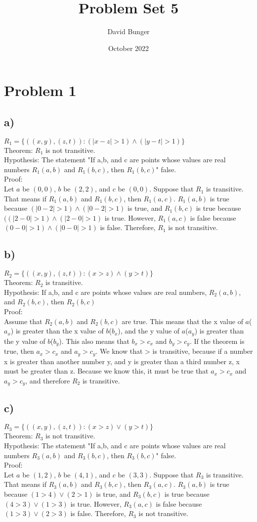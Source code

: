 \documentclass{article}
\title{Problem Set 5}
\author{David Bunger}
\date{October 2022}
\begin{document}
\maketitle

\section*{Problem 1}
\subsection*{a)}
$R_1 = \{((x,y),(z,t)): (|x-z|>1)\land (|y-t|>1)\}$\\
Theorem: $R_1$ is not transitive.\\
Hypothesis: The statement "If a,b, and c are points whose values are real numbers $R_1(a,b)$ and $R_1(b,c)$, then $R_1(b,c)$" false.\\
Proof:\\
Let $a$ be $(0,0)$, $b$ be $(2,2)$, and $c$ be $(0,0)$. Suppose that $R_1$ is transitive. That means if $R_1(a,b)$ and $R_1(b,c)$, then $R_1(a,c)$. $R_1(a,b)$ is true because $(|0-2|>1)\land (|0-2|>1)$ is true, and $R_1(b,c)$ is true because $((|2-0|>1)\land (|2-0|>1)$ is true. However, $R_1(a,c)$ is false because $(0-0|>1)\land (|0-0|>1)$ is false. Therefore, $R_1$ is not transitive.
\subsection*{b)}
$R_2=\{((x,y),(z,t)): (x>z)\land(y>t)\}$\\
Theorem: $R_2$ is transitive.\\
Hypothesis: If a,b, and c are points whose values are real numbers, $R_2(a,b)$, and $R_2(b,c)$, then $R_2(b,c)$\\
Proof:\\
Assume that $R_2(a,b)$ and $R_2(b,c)$ are true. This means that the x value of $a$($a_x$) is greater than the x value of $b$($b_x$), and the y value of $a$($a_y$) is greater than the y value of $b$($b_y$). This also means that $b_x > c_x$ and $b_y > c_y$. If the theorem is true, then $a_x>c_x$ and $a_y>c_y$. We know that > is transitive, because if a number x is greater than another number y, and y is greater than a third number z, x must be greater than z. Because we know this, it must be true that $a_x>c_x$ and $a_y>c_y$, and therefore $R_2$ is transitive.
\clearpage
\subsection*{c)}
$R_3=\{((x,y),(z,t)): (x>z)\lor(y>t)\}$\\
Theorem: $R_3$ is not transitive.\\
Hypothesis: The statement "If a,b, and c are points whose values are real numbers $R_3(a,b)$ and $R_3(b,c)$, then $R_3(b,c)$" false.\\
Proof:\\
Let $a$ be $(1,2)$, $b$ be $(4,1)$, and $c$ be $(3,3)$. Suppose that $R_3$ is transitive. That means if $R_3(a,b)$ and $R_3(b,c)$, then $R_3(a,c)$. $R_3(a,b)$ is true because $(1>4)\lor(2>1)$ is true, and $R_3(b,c)$ is true because $(4>3)\lor(1>3)$ is true. However, $R_3(a,c)$ is false because $(1>3)\lor(2>3)$ is false. Therefore, $R_3$ is not transitive.
\end{document}
